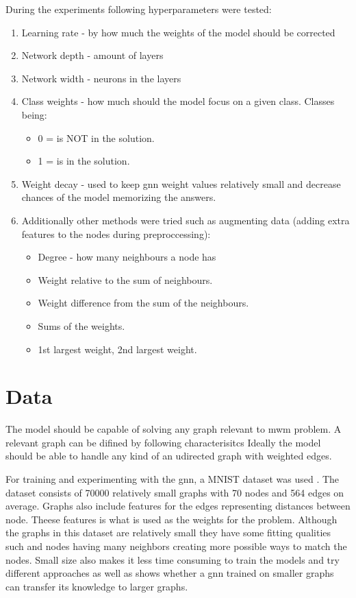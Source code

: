 During the experiments following hyperparameters were tested:
\begin{enumerate}
\item Learning rate - by how much the weights of the model should be corrected
\item Network depth - amount of layers 
\item Network width - neurons in the layers
\item Class weights - how much should the model focus on a given class. Classes being: 
	\begin{itemize}
	\item 0 = is NOT in the solution.
	\item 1 = is in the solution.
	\end{itemize}	
\item Weight decay - used to keep \gls{gnn} weight values relatively small and decrease chances of the model memorizing the answers. 

\item Additionally other methods were tried such as augmenting data (adding extra features to the nodes during preproccessing): 
	\begin{itemize}
	\item Degree - how many neighbours a node has
	\item Weight relative to the sum of neighbours.
	\item Weight difference from the sum of the neighbours.
	\item Sums of the weights. 
	\item 1st largest weight, 2nd largest weight.
	\end{itemize}

\end{enumerate}

\section{Data}

The model should be capable of solving any graph relevant to \gls{mwm} problem. A relevant graph can be difined by following characterisitcs
Ideally the model should be able to handle any kind of an udirected graph with weighted edges.

For training and experimenting with the \gls{gnn}, a MNIST dataset was used \cite{dwivedi2022benchmarking}. The dataset consists of 70000 relatively small graphs with 70 nodes and 564 edges on average. Graphs also include features for the edges representing distances between node. Theese features is what is used as the weights for the problem. Although the graphs in this dataset are relatively small they have some fitting qualities such and nodes having many neighbors creating more possible ways to match the nodes. Small size also makes it less time consuming to train the models and try different approaches as well as shows whether a \gls{gnn} trained on smaller graphs can transfer its knowledge to larger graphs.

